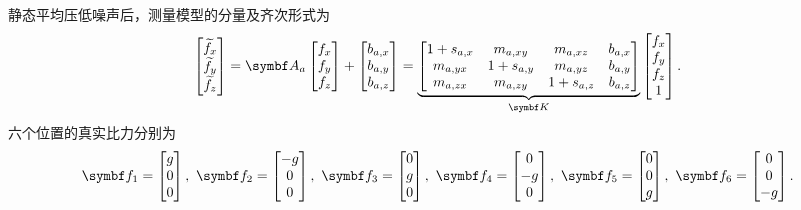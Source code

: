 静态平均压低噪声后，测量模型的分量及齐次形式为
\begin{equation}
\begin{bmatrix}\widetilde f_x\\\widetilde f_y\\\widetilde f_z\end{bmatrix}
=\matr A_a\begin{bmatrix}f_x\\f_y\\f_z\end{bmatrix}
+\begin{bmatrix}b_{a,x}\\b_{a,y}\\b_{a,z}\end{bmatrix}
=\underbrace{\begin{bmatrix}
1+s_{a,x}&m_{a,xy}&m_{a,xz}&b_{a,x}\\
m_{a,yx}&1+s_{a,y}&m_{a,yz}&b_{a,y}\\
m_{a,zx}&m_{a,zy}&1+s_{a,z}&b_{a,z}
\end{bmatrix}}_{\matr K}
\begin{bmatrix}f_x\\f_y\\f_z\\1\end{bmatrix}.
\label{eq:acchomogeneous}\end{equation}
六个位置的真实比力分别为
\begin{equation}
\matr f_1=\begin{bmatrix}g\\0\\0\end{bmatrix},\
\matr f_2=\begin{bmatrix}-g\\0\\0\end{bmatrix},\
\matr f_3=\begin{bmatrix}0\\g\\0\end{bmatrix},\
\matr f_4=\begin{bmatrix}0\\-g\\0\end{bmatrix},\
\matr f_5=\begin{bmatrix}0\\0\\g\end{bmatrix},\
\matr f_6=\begin{bmatrix}0\\0\\-g\end{bmatrix}.
\label{eq:sixtruth}\end{equation}

